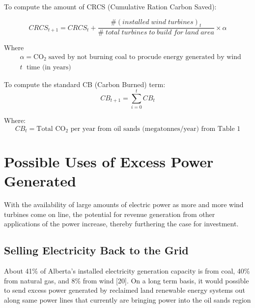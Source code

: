 \documentclass[11pt]{article}
\begin{document}
To compute the amount of CRCS (Cumulative Ration Carbon Saved):

\begin{displaymath}
CRCS_{t+1} = CRCS_t + \frac{\# (installed \;wind\; turbines)_t}{\# \;total \; turbines \; to\; build \; for \; land \; area} \times \alpha
\end{displaymath}

Where
\begin{displaymath}
\begin{split}
& \alpha =  \text{CO}_2 \;\text{saved by not burning coal to procude energy generated by wind}\\
& t \; \text{ time (in years)}
\end{split}
\end{displaymath}

To compute the standard CB (Carbon Burned) term: 
\begin{displaymath}
CB_{t+1} = \sum_{i=0}^{t} CB_t
\end{displaymath}

Where:
\begin{displaymath}
CB_t = \text{Total CO$_2$ per year from oil sands (megatonnes/year) from Table 1}
\end{displaymath}


\section{Possible Uses of Excess Power Generated}

With the availability of large amounts of electric power as more and more wind turbines come on line, the potential for revenue generation from other applications of the power increase, thereby furthering the case for investment.

\subsection{Selling Electricity Back to the Grid}

About 41\% of Alberta's installed electricity generation capacity is from coal, 40\% from natural gas, and 8\% from wind [20]. On a long term basis, it would possible to send excess power generated by reclaimed land renewable energy systems out along same power lines that currently are bringing power into the oil sands region
\end{document}
